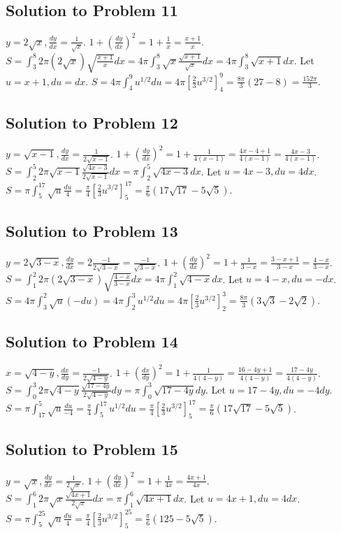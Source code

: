 \documentclass[12pt]{article}
\begin{document}
\subsection*{Solution to Problem 11}
$y=2\sqrt{x}, \frac{dy}{dx}=\frac{1}{\sqrt{x}}$. $1+(\frac{dy}{dx})^2 = 1+\frac{1}{x} = \frac{x+1}{x}$.
$S = \int_3^8 2\pi (2\sqrt{x}) \sqrt{\frac{x+1}{x}} dx = 4\pi \int_3^8 \sqrt{x} \frac{\sqrt{x+1}}{\sqrt{x}} dx = 4\pi \int_3^8 \sqrt{x+1} dx$.
Let $u=x+1, du=dx$. $S = 4\pi \int_4^9 u^{1/2} du = 4\pi[\frac{2}{3}u^{3/2}]_4^9 = \frac{8\pi}{3}(27-8)=\frac{152\pi}{3}$.

\subsection*{Solution to Problem 12}
$y=\sqrt{x-1}, \frac{dy}{dx}=\frac{1}{2\sqrt{x-1}}$. $1+(\frac{dy}{dx})^2 = 1+\frac{1}{4(x-1)} = \frac{4x-4+1}{4(x-1)} = \frac{4x-3}{4(x-1)}$.
$S=\int_2^5 2\pi \sqrt{x-1} \frac{\sqrt{4x-3}}{2\sqrt{x-1}} dx = \pi \int_2^5 \sqrt{4x-3} dx$.
Let $u=4x-3, du=4dx$. $S=\pi \int_5^{17} \sqrt{u} \frac{du}{4} = \frac{\pi}{4}[\frac{2}{3}u^{3/2}]_5^{17} = \frac{\pi}{6}(17\sqrt{17}-5\sqrt{5})$.

\subsection*{Solution to Problem 13}
$y=2\sqrt{3-x}, \frac{dy}{dx}=2\frac{-1}{2\sqrt{3-x}}=\frac{-1}{\sqrt{3-x}}$. $1+(\frac{dy}{dx})^2 = 1+\frac{1}{3-x} = \frac{3-x+1}{3-x} = \frac{4-x}{3-x}$.
$S=\int_1^2 2\pi (2\sqrt{3-x}) \sqrt{\frac{4-x}{3-x}} dx = 4\pi \int_1^2 \sqrt{4-x} dx$.
Let $u=4-x, du=-dx$. $S=4\pi \int_3^2 \sqrt{u}(-du) = 4\pi \int_2^3 u^{1/2}du = 4\pi[\frac{2}{3}u^{3/2}]_2^3 = \frac{8\pi}{3}(3\sqrt{3}-2\sqrt{2})$.

\subsection*{Solution to Problem 14}
$x=\sqrt{4-y}, \frac{dx}{dy}=\frac{-1}{2\sqrt{4-y}}$. $1+(\frac{dx}{dy})^2 = 1+\frac{1}{4(4-y)} = \frac{16-4y+1}{4(4-y)} = \frac{17-4y}{4(4-y)}$.
$S=\int_0^3 2\pi \sqrt{4-y} \frac{\sqrt{17-4y}}{2\sqrt{4-y}} dy = \pi \int_0^3 \sqrt{17-4y} dy$.
Let $u=17-4y, du=-4dy$. $S=\pi \int_{17}^5 \sqrt{u} \frac{du}{-4} = \frac{\pi}{4}\int_5^{17} u^{1/2}du = \frac{\pi}{4}[\frac{2}{3}u^{3/2}]_5^{17} = \frac{\pi}{6}(17\sqrt{17}-5\sqrt{5})$.

\subsection*{Solution to Problem 15}
$y=\sqrt{x}, \frac{dy}{dx}=\frac{1}{2\sqrt{x}}$. $1+(\frac{dy}{dx})^2=1+\frac{1}{4x}=\frac{4x+1}{4x}$.
$S=\int_1^6 2\pi \sqrt{x} \frac{\sqrt{4x+1}}{2\sqrt{x}} dx = \pi \int_1^6 \sqrt{4x+1} dx$.
Let $u=4x+1, du=4dx$. $S=\pi \int_5^{25} \sqrt{u}\frac{du}{4} = \frac{\pi}{4}[\frac{2}{3}u^{3/2}]_5^{25} = \frac{\pi}{6}(125-5\sqrt{5})$.
\end{document}
